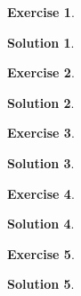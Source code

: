 \documentclass{article}
\newtheorem{ex}{Exercise}
\theoremstyle{nonumberplain}
\newtheorem{sol}{Solution}
\begin{document}
\begin{ex}
\end{ex}

\begin{sol}
\end{sol}

\begin{ex}
\end{ex}

\begin{sol}
\end{sol}

\begin{ex}
\end{ex}

\begin{sol}
\end{sol}

\begin{ex}
\end{ex}

\begin{sol}
\end{sol}

\begin{ex}
\end{ex}

\begin{sol}
\end{sol}
\end{document}
